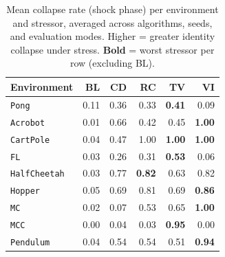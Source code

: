 \begin{table}[t]
\centering
\caption{Mean collapse rate (shock phase) per environment and stressor, averaged across algorithms, seeds, and evaluation modes. Higher = greater identity collapse under stress. \textbf{Bold} = worst stressor per row (excluding BL).}
\label{tab:collapse_rate_main}
\setlength{\tabcolsep}{5pt}
\begin{tabular}{lrrrrr}
\toprule
Environment & BL & CD & RC & TV & VI \\
\midrule
\texttt{Pong} & 0.11 & 0.36 & 0.33 & \textbf{0.41} & 0.09 \\
\texttt{Acrobot} & 0.01 & 0.66 & 0.42 & 0.45 & \textbf{1.00} \\
\texttt{CartPole} & 0.04 & 0.47 & 1.00 & \textbf{1.00} & \textbf{1.00} \\
\texttt{FL} & 0.03 & 0.26 & 0.31 & \textbf{0.53} & 0.06 \\
\texttt{HalfCheetah} & 0.03 & 0.77 & \textbf{0.82} & 0.63 & 0.82 \\
\texttt{Hopper} & 0.05 & 0.69 & 0.81 & 0.69 & \textbf{0.86} \\
\texttt{MC} & 0.02 & 0.07 & 0.53 & 0.65 & \textbf{1.00} \\
\texttt{MCC} & 0.00 & 0.04 & 0.03 & \textbf{0.95} & 0.00 \\
\texttt{Pendulum} & 0.04 & 0.54 & 0.54 & 0.51 & \textbf{0.94} \\
\bottomrule
\end{tabular}
\end{table}
